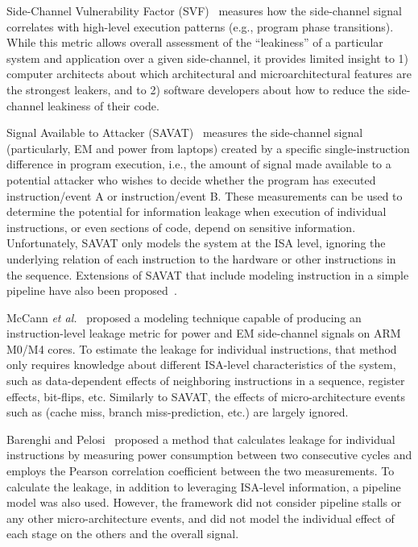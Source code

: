 \documentclass[11 pt]{article}
\begin{document}
Side-Channel Vulnerability Factor (SVF)~\cite{Demme:2013:FOM:2485922.2485970} measures how the side-channel signal correlates with
high-level execution patterns (e.g., program phase transitions).
While this metric allows overall assessment of the
``leakiness'' of a particular system and application over a
given side-channel, it provides limited insight to 1) computer
architects about which architectural and microarchitectural
features are the strongest leakers, and to 2) software developers
about how to reduce the side-channel leakiness of their
code.

Signal Available to Attacker (SAVAT)~\cite{Callan:2014:PMM:2742155.2742179} measures the side-channel signal (particularly, EM and power from laptops) created by a specific single-instruction difference in program execution, i.e., the amount of signal made available
to a potential attacker who wishes to decide whether the program has executed instruction/event A or instruction/event B. These measurements can be used
to determine the potential for information leakage when
execution of individual instructions, or even sections of code,
depend on sensitive information. Unfortunately, SAVAT only models the system at the ISA level, ignoring the underlying relation of each instruction to the hardware or other instructions in the sequence. Extensions of SAVAT that include modeling instruction in a simple pipeline have also been proposed~\cite{baki17,Baki_2020a}.

McCann \textit{et al.}~\cite{McCann:2017:TPT:3241189.3241207} proposed a modeling technique capable of producing an instruction-level leakage metric for power and EM side-channel signals on ARM M0/M4 cores. To estimate the leakage for individual instructions, that method only requires knowledge about different ISA-level characteristics of the system, such as data-dependent effects of neighboring instructions in a sequence, register effects, bit-flips, etc. Similarly to SAVAT, the effects of micro-architecture events such as (cache miss, branch miss-prediction, etc.) are largely ignored.

Barenghi and Pelosi~\cite{Barenghi:2018:SSS:3195970.3196112} proposed a method that calculates leakage for individual instructions by measuring power consumption between two consecutive cycles and employs the Pearson correlation coefficient between the two measurements. To calculate the leakage, in addition to leveraging  ISA-level information, a pipeline model was also used. However, the framework did not consider pipeline stalls or any other micro-architecture events, and did not model the individual effect of each stage on the others and the overall signal.
\end{document}
